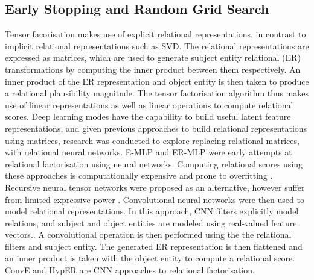 \subsection{Early Stopping and Random Grid Search}
Tensor facorisation makes use of explicit relational representations, in contrast to implicit relational representations such as SVD. The relational representations are expressed as matrices, which are used to generate subject entity relational (ER) transformations by computing the inner product between them respectively. An inner product of the ER representation and object entity is then taken to produce a relational plausibility magnitude. The tensor factorisation algorithm thus makes use of linear representations as well as linear operations to compute relational scores. 
Deep learning modes have the capability to build useful latent feature representations, and given previous approaches to build relational representations using matrices, research was conducted to explore replacing relational matrices, with relational neural networks. E-MLP and ER-MLP were early attempts at relational factorisation using neural networks. Computing relational scores using these approaches is computationally expensive and prone to overfitting \cite{reference}. Recursive neural tensor networks were proposed as an alternative, however suffer from limited expressive power \cite{reference}.
Convolutional neural networks were then used to model relational representations. In this approach, CNN filters explicitly model relations, and subject and object entities are modeled using real-valued feature vectors.. A convolutional operation is then performed using the the relational filters and subject entity. The generated ER representation is then flattened and an inner product is taken with the object entity to compute a relational score. ConvE and HypER are CNN approaches to relational factorisation. 

